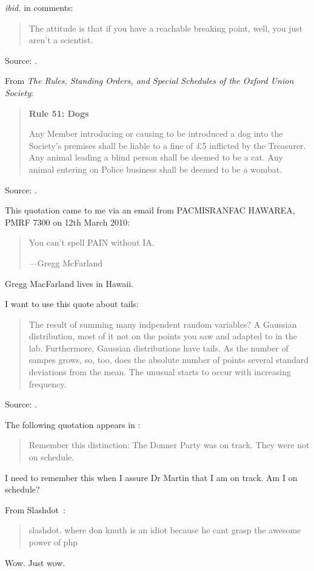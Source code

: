 \documentclass[a4paper]{article}
\begin{document}
{\it ibid.} in comments:
\begin{quote}
	The attitude is that if you have a reachable breaking point,
	well, you just aren't a scientist.
\end{quote}
Source: \citet[comment \textnumero~2]{Lowe2007}.
\medskip

From {\it The Rules, Standing Orders, and Special Schedules of the
Oxford Union Society}:
\begin{quote}
	{\bf Rule 51: Dogs}

	Any Member introducing or causing to be introduced a dog into the
	Society's premises shall be liable to a fine of \pounds 5 inflicted
	by the Treasurer. Any animal leading a blind person shall be deemed
	to be a cat. Any animal entering on Police business shall be deemed
	to be a wombat.
\end{quote}
Source: \citet{OUS2007}.
\medskip

This quotation came to me via an email from PACMISRANFAC HAWAREA,
PMRF 7300 on 12th March 2010:
\begin{quote}
	You can't spell PAIN without IA.

	---Gregg McFarland
\end{quote}
Gregg MacFarland lives in Hawaii.
\medskip

I want to use this quote about tails:
\begin{quote}
	The result of summing many indpendent random variables?  A Gaussian
	distribution, most of it not on the points you saw and adapted to
	in the lab.  Furthermore, Gaussian distributions have tails.  As the
	number of sampes grows, so, too, does the absolute number of points
	several standard deviations from the mean.  The unusual starts to
	occur with increasing frequency.
\end{quote}
Source: \citet[p.~67]{Bessey2010}.
\medskip

The following quotation appears in \citet{Hodge2010}:
\begin{quote}
	Remember this distinction: The Donner Party was on track.  They were not
	on schedule.
\end{quote}
I need to remember this when I assure Dr Martin that I am on track.  Am I on
schedule?

\medskip
From Slashdot~\citep{convolvatron2010}:
\begin{quote}
	slashdot. where don knuth is an idiot because he cant grasp the awesome power of php
\end{quote}
Wow.  Just wow.
\end{document}
